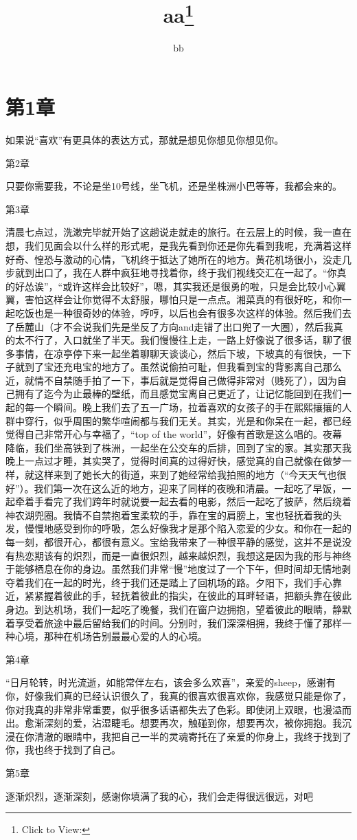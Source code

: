\documentclass{article}
\title{aa\footnote{Click to View:\url{}}}
\author{bb}
\date{}
\begin{document}


\Large

{\centering\section*{第1章}}

如果说“喜欢”有更具体的表达方式，那就是想见你想见你想见你。

第2章

只要你需要我，不论是坐10号线，坐飞机，还是坐株洲小巴等等，我都会来的。

第3章

清晨七点过，洗漱完毕就开始了这趟说走就走的旅行。在云层上的时候，我一直在想，我们见面会以什么样的形式呢，是我先看到你还是你先看到我呢，充满着这样好奇、惶恐与激动的心情，飞机终于抵达了她所在的地方。黄花机场很小，没走几步就到出口了，我在人群中疯狂地寻找着你，终于我们视线交汇在一起了。“你真的好怂诶”，“或许这样会比较好”，嗯，其实我还是很勇的啦，只是会比较小心翼翼，害怕这样会让你觉得不太舒服，哪怕只是一点点。湘菜真的有很好吃，和你一起吃饭也是一种很奇妙的体验，哼哼，以后也会有很多次这样的体验。然后我们去了岳麓山（才不会说我们先是坐反了方向and走错了出口兜了一大圈），然后我真的太不行了，入口就坐了半天。我们慢慢往上走，一路上好像说了很多话，聊了很多事情，在凉亭停下来一起坐着聊聊天谈谈心，然后下坡，下坡真的有很快，一下子就到了宝还充电宝的地方了。虽然说偷拍可耻，但我看到宝的背影离自己那么近，就情不自禁随手拍了一下，事后就是觉得自己做得非常对（贱死了），因为自己拥有了迄今为止最棒的壁纸，而且感觉宝离自己更近了，让记忆能回到在我们一起的每一个瞬间。晚上我们去了五一广场，拉着喜欢的女孩子的手在熙熙攘攘的人群中穿行，似乎周围的繁华喧闹都与我们无关。其实，光是和你呆在一起，都已经觉得自己非常开心与幸福了，“top of the world”，好像有首歌是这么唱的。夜幕降临，我们坐高铁到了株洲，一起坐在公交车的后排，回到了宝的家。其实那天我晚上一点过才睡，其实哭了，觉得时间真的过得好快，感觉真的自己就像在做梦一样，就这样来到了她长大的街道，来到了她经常给我拍照的地方（“今天天气也很好”）。我们第一次在这么近的地方，迎来了同样的夜晚和清晨。一起吃了早饭，一起牵着手看完了我们跨年时就说要一起去看的电影，然后一起吃了披萨，然后绕着神农湖兜圈。我情不自禁抱着宝柔软的手，靠在宝的肩膀上，宝也轻抚着我的头发，慢慢地感受到你的呼吸，怎么好像我才是那个陷入恋爱的少女。和你在一起的每一刻，都很开心，都很有意义。宝给我带来了一种很平静的感觉，这并不是说没有热恋期该有的炽烈，而是一直很炽烈，越来越炽烈，我想这是因为我的形与神终于能够栖息在你的身边。虽然我们非常“慢”地度过了一个下午，但时间却无情地剥夺着我们在一起的时光，终于我们还是踏上了回机场的路。夕阳下，我们手心靠近，紧紧握着彼此的手，轻抚着彼此的指尖，在彼此的耳畔轻语，把额头靠在彼此身边。到达机场，我们一起吃了晚餐，我们在窗户边拥抱，望着彼此的眼睛，静默着享受着旅途中最后留给我们的时间。分别时，我们深深相拥，我终于懂了那样一种心境，那种在机场告别最最心爱的人的心境。

第4章

“日月轮转，时光流逝，如能常伴左右，该会多么欢喜”，亲爱的sheep，感谢有你，好像我们真的已经认识很久了，我真的很喜欢很喜欢你，我感觉只能是你了，你对我真的非常非常重要，似乎很多话语都失去了色彩。即使闭上双眼，也漫溢而出。愈渐深刻的爱，沾湿睫毛。想要再次，触碰到你，想要再次，被你拥抱。我沉浸在你清澈的眼睛中，我把自己一半的灵魂寄托在了亲爱的你身上，我终于找到了你，我也终于找到了自己。

第5章

逐渐炽烈，逐渐深刻，感谢你填满了我的心，我们会走得很远很远，对吧
\end{document}
